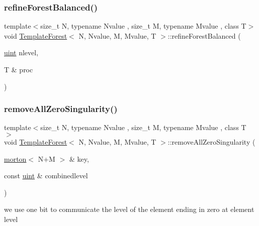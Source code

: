 \subsubsection{\texorpdfstring{refine\+Forest\+Balanced()}{refineForestBalanced()}}
{\footnotesize\ttfamily template$<$size\+\_\+t N, typename Nvalue , size\+\_\+t M, typename Mvalue , class T$>$ \\
void \mbox{\hyperlink{classTemplateForest}{Template\+Forest}}$<$ N, Nvalue, M, Mvalue, T $>$\+::refine\+Forest\+Balanced (\begin{DoxyParamCaption}\item[{\mbox{\hyperlink{definitions_8h_a69aa29b598b851b0640aa225a9e5d61d}{uint}}}]{nlevel,  }\item[{T \&}]{proc }\end{DoxyParamCaption})}

\mbox{\label{classTemplateForest_a5c2bf9dfe92ff1cb400fdbdba4bedf78}} 
\subsubsection{\texorpdfstring{remove\+All\+Zero\+Singularity()}{removeAllZeroSingularity()}}
{\footnotesize\ttfamily template$<$size\+\_\+t N, typename Nvalue , size\+\_\+t M, typename Mvalue , class T $>$ \\
void \mbox{\hyperlink{classTemplateForest}{Template\+Forest}}$<$ N, Nvalue, M, Mvalue, T $>$\+::remove\+All\+Zero\+Singularity (\begin{DoxyParamCaption}\item[{\mbox{\hyperlink{definitions_8h_af8682350bd8bb38ee9023f7a0a310add}{morton}}$<$ N+M $>$ \&}]{key,  }\item[{const \mbox{\hyperlink{definitions_8h_a69aa29b598b851b0640aa225a9e5d61d}{uint}} \&}]{combinedlevel }\end{DoxyParamCaption})}

we use one bit to communicate the level of the element ending in zero at element level \mbox{\label{classTemplateForest_a070fad5f90490ac39ae703c080dc989d}} 

